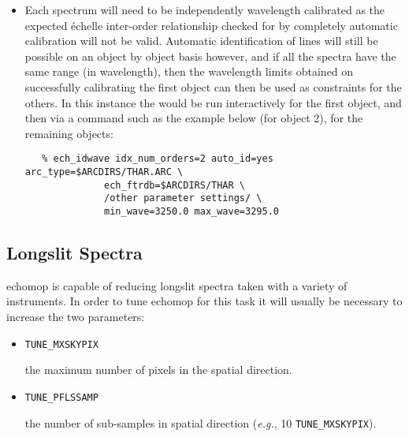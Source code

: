 \begin{itemize}

\item Each spectrum will need to be independently wavelength
      calibrated as the expected \'{e}chelle inter-order relationship checked
      for by completely automatic calibration will not be valid. Automatic
      identification of lines will still be possible on an object by object
      basis however, and if all the spectra have the same range (in
      wavelength), then the wavelength limits obtained on successfully
      calibrating the first object can then be used as constraints for the
      others. In this instance the 
      would be run interactively for the first object, and then via a command
      such as the example below (for object 2), for the remaining objects:

\begin{verbatim}
   % ech_idwave idx_num_orders=2 auto_id=yes arc_type=$ARCDIRS/THAR.ARC \
              ech_ftrdb=$ARCDIRS/THAR \
              /other parameter settings/ \
              min_wave=3250.0 max_wave=3295.0
\end{verbatim}

\end{itemize}


\subsection{Longslit Spectra}

{\sc echomop} is capable of reducing longslit spectra taken with a variety of
instruments.  In order to tune {\sc echomop} for this task it will usually be
necessary to increase the two parameters:

\begin{itemize}

\item {\verb+TUNE_MXSKYPIX+}

      the maximum number of pixels in the spatial direction.

\item {\verb+TUNE_PFLSSAMP+}

      the number of sub-samples in spatial direction ({\it{e.g.}},
      10  \verb+TUNE_MXSKYPIX+).

\end{itemize}


